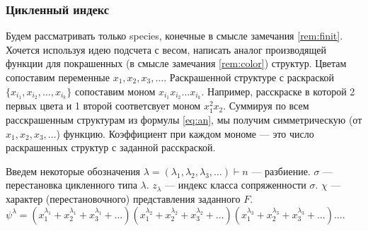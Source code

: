 \subsubsection{Цикленный индекс}
\label{sec:cycle}

Будем рассматривать только species, конечные в смысле замечания
\ref{rem:finit}.
Хочется используя идею подсчета с весом, написать аналог производящей функции
для покрашенных (в смысле замечания \ref{rem:color}) структур. Цветам
сопоставим переменные $x_1, x_2, x_3, \dots$. Раскрашенной структуре с
раскраской $\{x_{i_1}, x_{i_2}, \dots, x_{i_k}\}$ сопоставим моном $x_{i_1} x_{i_2} \dots x_{i_k}$.  
Например, расскраске в которой 2 первых цвета и 1 второй соответсвует моном
$x_1^2x_2$. 
Суммируя по всем расскрашенным структурам из формулы \ref{eq:an}, мы получим
симметрическую (от $x_1, x_2, x_3, \dots$) функцию. Коэффициент
при каждом мономе --- это число раскрашенных структур с заданной расскраской. 

Введем некоторые обозначения 
$\lambda = (\lambda_1, \lambda_2, \lambda_3, \dots) \vdash n$ --- разбиение.
$\sigma$ --- перестановка цикленного типа $\lambda$. $z_\lambda$ --- индекс
класса сопряженности $\sigma$.
$\chi$ --- характер (перестановочного) представления заданного $F$.
$\psi^{\lambda} = 
(x_1^{\lambda_1} + x_2^{\lambda_1} + x_3^{\lambda_1} + \dots)
(x_1^{\lambda_2} + x_2^{\lambda_2} + x_3^{\lambda_2} + \dots)
(x_1^{\lambda_3} + x_2^{\lambda_3} + x_3^{\lambda_3} + \dots)
\dots$.

